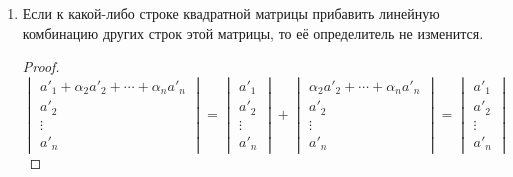 \begin{enumerate}
\begin{proof}
$\begin{vmatrix} a'_1 \\ a'_2 \\ \vdots \\ a'_n \end{vmatrix}=
\begin{vmatrix} \alpha_2{}a'_2+\cdots+\alpha_n{}a'_n \\ a'_2 \\ \vdots \\ a'_n \end{vmatrix}=\begin{vmatrix} \alpha_2{}a'_2 \\ a'_2 \\ \vdots \\ a'_n \end{vmatrix}+\cdots+\begin{vmatrix} \alpha_n{}a'_n \\ a'_2 \\ \vdots \\ a'_n \end{vmatrix}=\alpha_2\begin{vmatrix} a'_2 \\ a'_2 \\ \vdots \\ a'_n \end{vmatrix}+\cdots+\alpha_n\begin{vmatrix} a'_n \\ a'_2 \\ \vdots \\ a'_n \end{vmatrix}$

В каждом определителе есть одинаковые строки, следовательно, $|A|=0$.
\end{proof}
\item Если к какой-либо строке квадратной матрицы прибавить линейную комбинацию других строк этой матрицы, то её определитель не изменится.
\begin{proof}
$\begin{vmatrix} a'_1+\alpha_2{}a'_2+\cdots+\alpha_n{}a'_n \\ a'_2 \\ \vdots \\ a'_n \end{vmatrix}=\begin{vmatrix} a'_1 \\ a'_2 \\ \vdots \\ a'_n \end{vmatrix}+\begin{vmatrix} \alpha_2{}a'_2+\cdots+\alpha_n{}a'_n \\ a'_2 \\ \vdots \\ a'_n \end{vmatrix}=\begin{vmatrix} a'_1 \\ a'_2 \\ \vdots \\ a'_n \end{vmatrix}$
\end{proof}
\end{enumerate}
